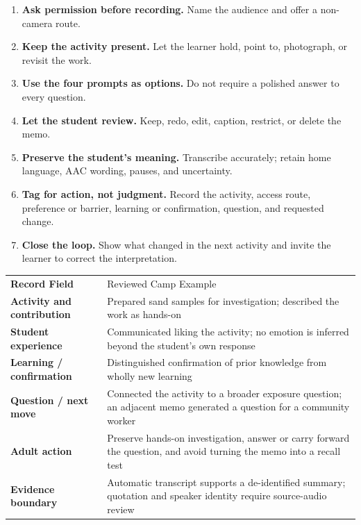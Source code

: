 \begin{enumerate}
  \item \textbf{Ask permission before recording.} Name the audience and offer a non-camera route.
  \item \textbf{Keep the activity present.} Let the learner hold, point to, photograph, or revisit the work.
  \item \textbf{Use the four prompts as options.} Do not require a polished answer to every question.
  \item \textbf{Let the student review.} Keep, redo, edit, caption, restrict, or delete the memo.
  \item \textbf{Preserve the student's meaning.} Transcribe accurately; retain home language, AAC wording, pauses, and uncertainty.
  \item \textbf{Tag for action, not judgment.} Record the activity, access route, preference or barrier, learning or confirmation, question, and requested change.
  \item \textbf{Close the loop.} Show what changed in the next activity and invite the learner to correct the interpretation.
\end{enumerate}


\small
\renewcommand{\arraystretch}{1.08}
\setlength{\tabcolsep}{4pt}
\begin{tabularx}{\textwidth}{>{\bfseries\RaggedRight\arraybackslash}p{1.35in} >{\RaggedRight\arraybackslash}X}
\rowcolor{MidTeal}
\color{white}Record Field & \color{white}Reviewed Camp Example \\
Activity and contribution & Prepared sand samples for investigation; described the work as hands-on \\
\rowcolor{SoftGray}
Student experience & Communicated liking the activity; no emotion is inferred beyond the student's own response \\
Learning / confirmation & Distinguished confirmation of prior knowledge from wholly new learning \\
\rowcolor{SoftGray}
Question / next move & Connected the activity to a broader exposure question; an adjacent memo generated a question for a community worker \\
Adult action & Preserve hands-on investigation, answer or carry forward the question, and avoid turning the memo into a recall test \\
\rowcolor{SoftGray}
Evidence boundary & Automatic transcript supports a de-identified summary; quotation and speaker identity require source-audio review \\
\end{tabularx}
\normalsize

